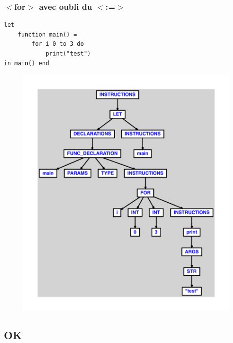 \documentclass{article}
\begin{document}
\subsubsection{$ < $for$ > $ avec oubli du $ < $:=$ > $}
\begin{lstlisting}
let
	function main() =
		for i 0 to 3 do
			print("test")
in main() end
\end{lstlisting}
\newpage
\begin{figure}[H]
\centering
\includegraphics[max width=\textwidth]{ast/ast_204.pdf}
\end{figure}
\newpage
\subsection{OK}
\end{document}
